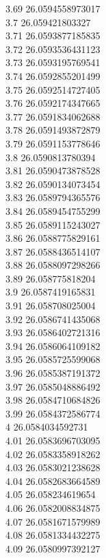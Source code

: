 {3.69	26.0594558973017\\
3.7	26.059421803327\\
3.71	26.0593877185835\\
3.72	26.0593536431123\\
3.73	26.0593195769541\\
3.74	26.0592855201499\\
3.75	26.0592514727405\\
3.76	26.0592174347665\\
3.77	26.0591834062688\\
3.78	26.0591493872879\\
3.79	26.0591153778646\\
3.8	26.0590813780394\\
3.81	26.0590473878528\\
3.82	26.0590134073454\\
3.83	26.0589794365576\\
3.84	26.0589454755299\\
3.85	26.0589115243027\\
3.86	26.0588775829161\\
3.87	26.0588436514107\\
3.88	26.0588097298266\\
3.89	26.058775818204\\
3.9	26.0587419165831\\
3.91	26.058708025004\\
3.92	26.0586741435068\\
3.93	26.0586402721316\\
3.94	26.0586064109182\\
3.95	26.0585725599068\\
3.96	26.0585387191372\\
3.97	26.0585048886492\\
3.98	26.0584710684826\\
3.99	26.0584372586774\\
4	26.0584034592731\\
4.01	26.0583696703095\\
4.02	26.0583358918262\\
4.03	26.0583021238628\\
4.04	26.0582683664589\\
4.05	26.058234619654\\
4.06	26.0582008834875\\
4.07	26.0581671579989\\
4.08	26.0581334432275\\
4.09	26.0580997392127\\
}
